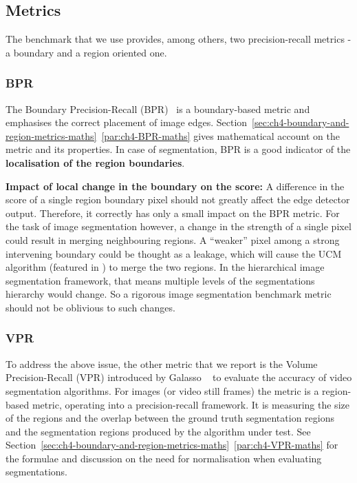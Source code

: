 \subsection{Metrics}
The benchmark that we use provides, among others, two precision-recall metrics - a boundary and a region oriented one.

\subsubsection{BPR}
The Boundary Precision-Recall (BPR)~\cite{Arbelaez11} is a boundary-based metric and emphasises the correct placement of image edges. Section~\ref*{sec:ch4-boundary-and-region-metrics-maths}~\ref{par:ch4-BPR-maths} %
gives mathematical account on the metric and its properties. In case of segmentation, BPR is a good indicator of the {\bf localisation of the region boundaries}.

\textbf{Impact of %
local change in the boundary on the score:} A difference in the score of a single region boundary pixel should not greatly affect the edge detector output. Therefore, it correctly has only a small impact on the BPR metric. For the task of image segmentation however, a change in the strength of a single pixel could result in merging neighbouring regions. A ``weaker'' pixel among a strong intervening boundary could be thought as a leakage, which will cause the UCM algorithm (featured in ) %
to merge the two regions. In the hierarchical image segmentation framework, that means multiple levels of the segmentations hierarchy would change. So a rigorous image segmentation benchmark metric should not be oblivious to such changes.

\subsubsection{VPR}
To address the above issue, the other metric that we report is the Volume Precision-Recall (VPR) introduced by Galasso \etal~\cite{Galasso13} to evaluate the accuracy of video segmentation algorithms. For images (or video still frames) the metric is a region-based metric, operating %
into a precision-recall framework. It is measuring the size of the regions and the overlap between the ground truth segmentation regions and the segmentation regions produced by the algorithm under test. 
See Section~\ref*{sec:ch4-boundary-and-region-metrics-maths}~\ref{par:ch4-VPR-maths} for the formulae and discussion on the need for normalisation when evaluating segmentations.

